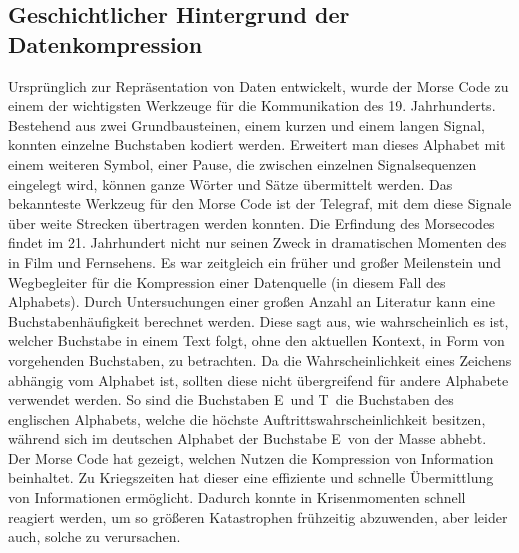 \subsection{Geschichtlicher Hintergrund der Datenkompression}
\label{subsec:main_kompression}
Ursprünglich zur Repräsentation von Daten entwickelt, wurde der Morse Code zu einem der wichtigsten Werkzeuge für die Kommunikation des 19. Jahrhunderts. 
Bestehend aus zwei Grundbausteinen, einem kurzen und einem langen Signal, konnten einzelne Buchstaben kodiert werden. 
Erweitert man dieses Alphabet mit einem weiteren Symbol, einer Pause, die zwischen einzelnen Signalsequenzen eingelegt wird, können ganze Wörter und Sätze übermittelt werden. 
Das bekannteste Werkzeug für den Morse Code ist der Telegraf, mit dem diese Signale über weite Strecken übertragen werden konnten.
Die Erfindung des Morsecodes findet im 21. Jahrhundert nicht nur seinen Zweck in dramatischen Momenten des in Film und Fernsehens. 
Es war zeitgleich ein früher und großer Meilenstein und Wegbegleiter für die Kompression einer Datenquelle (in diesem Fall des Alphabets). 
Durch Untersuchungen einer großen Anzahl an Literatur kann eine Buchstabenhäufigkeit berechnet werden. 
Diese sagt aus, wie wahrscheinlich es ist, welcher Buchstabe in einem Text folgt, ohne den aktuellen Kontext, in Form von vorgehenden Buchstaben, zu betrachten.
Da die Wahrscheinlichkeit eines Zeichens abhängig vom Alphabet ist, sollten diese nicht übergreifend für andere Alphabete verwendet werden. 
So sind die Buchstaben \glqq E\grqq\ und \glqq T\grqq\ die Buchstaben des englischen Alphabets, welche die höchste Auftrittswahrscheinlichkeit besitzen, während sich im deutschen Alphabet der Buchstabe \glqq E\grqq\ von der Masse abhebt.
Der Morse Code hat gezeigt, welchen Nutzen die Kompression von Information beinhaltet.
Zu Kriegszeiten hat dieser eine effiziente und schnelle Übermittlung von Informationen ermöglicht.
Dadurch konnte in Krisenmomenten schnell reagiert werden, um so größeren Katastrophen frühzeitig abzuwenden, aber leider auch, solche zu verursachen.

